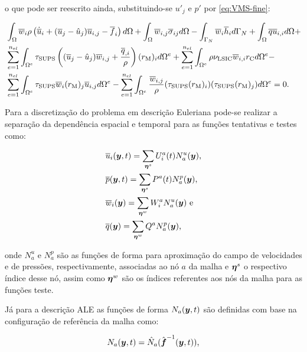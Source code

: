 \noindent o que pode ser reescrito ainda, substituindo-se $u'_j$ e $p'$ por \eqref{eq:VMS-fine}:

\begin{equation}
    \begin{split}
        &\int_{\Omega}{\overline{w}_i\rho\left({\dot{\overline{u}}_i+(\overline{u}_j-\hat{u}_j)\overline{u}_{i,j}-\overline{f}_i}\right) d\Omega}+\int_{\Omega}{\overline{w}_{i,j}\overline{\sigma}_{ij} d\Omega}-\int_{\Gamma_N}{\overline{w}_i\overline{h}_i d\Gamma_N}+\int_{\Omega}{\overline{q}\overline{u}_{i,i} d\Omega}+\\
        &\sum_{e=1}^{n_{el}}{\int_{\Omega^e}{\tau_{\mathrm{SUPS}}\left({(\overline{u}_j-\hat{u}_j)\overline{w}_{i,j}+\frac{\overline{q}_{,i}}{\rho}}\right)(r_\mathrm{M})_{i} d\Omega^e}}+\sum_{e=1}^{n_{el}}{\int_{\Omega^e}{\rho\nu_{\mathrm{LSIC}}\overline{w}_{i,i}r_\mathrm{C} d\Omega^e}}-\\
        &\sum_{e=1}^{n_{el}}{\int_{\Omega^e}{\tau_{\mathrm{SUPS}}\overline{w}_i(r_\mathrm{M})_{j}\overline{u}_{i,j} d\Omega^e}}-\sum_{e=1}^{n_{el}}{\int_{\Omega^e}{\frac{\overline{w}_{i,j}}{\rho}(\tau_{\mathrm{SUPS}}(r_\mathrm{M})_{i})(\tau_{\mathrm{SUPS}}(r_\mathrm{M})_{j}) d\Omega^e}}=0
        \text{.}
        \label{eq:RBVMS1}
    \end{split}
\end{equation}

Para a discretização do problema em descrição Euleriana pode-se realizar a separação da dependência espacial e temporal para as funções tentativas e testes como:

\begin{subequations}
    \begin{align}
         & \overline{u}_i(\boldsymbol{y},t)=\sum_{\boldsymbol{\eta}^s}{U_i^a(t)N_a^u(\boldsymbol{y})}\text{,}\label{eq:uh} \\
         & \overline{p}(\boldsymbol{y},t)=\sum_{\boldsymbol{\eta}^s}{P^a(t)N_a^p(\boldsymbol{y})}\text{,}                  \\
         & \overline{w}_i(\boldsymbol{y})=\sum_{\boldsymbol{\eta}^w}{W_i^aN_a^u(\boldsymbol{y})}\text{ e}\label{eq:w-sep}  \\
         & \overline{q}(\boldsymbol{y})=\sum_{\boldsymbol{\eta}^w}{Q^aN_a^p(\boldsymbol{y})}\text{,}\label{eq:q-sep}
    \end{align}
\end{subequations}

\noindent onde $N_a^u$ e $N_a^p$ são as funções de forma para aproximação do campo de velocidades e de pressões, respectivamente, associadas ao nó $a$ da malha e $\boldsymbol{\eta}^s$ o respectivo índice desse nó, assim como $\boldsymbol{\eta}^w$ são os índices referentes aos nós da malha para as funções teste.

Já para a descrição ALE as funções de forma $N_a(\boldsymbol{y},t)$ são definidas com base na configuração de referência da malha como:

\begin{equation}
    N_a(\boldsymbol{y},t)=\hat{N}_a(\hat{\boldsymbol{f}}^{-1}(\boldsymbol{y},t))\text{,}
\end{equation}

